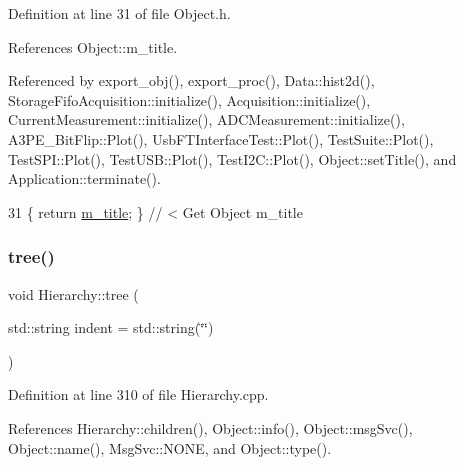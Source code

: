 Definition at line 31 of file Object.\+h.



References Object\+::m\+\_\+title.



Referenced by export\+\_\+obj(), export\+\_\+proc(), Data\+::hist2d(), Storage\+Fifo\+Acquisition\+::initialize(), Acquisition\+::initialize(), Current\+Measurement\+::initialize(), A\+D\+C\+Measurement\+::initialize(), A3\+P\+E\+\_\+\+Bit\+Flip\+::\+Plot(), Usb\+F\+T\+Interface\+Test\+::\+Plot(), Test\+Suite\+::\+Plot(), Test\+S\+P\+I\+::\+Plot(), Test\+U\+S\+B\+::\+Plot(), Test\+I2\+C\+::\+Plot(), Object\+::set\+Title(), and Application\+::terminate().


\begin{DoxyCode}
31 \{ \textcolor{keywordflow}{return} \hyperlink{classObject_affbeea1953eb5163573b92fad8f75727}{m\_title};      \} \textcolor{comment}{// < Get Object m\_title}
\end{DoxyCode}
\mbox{\label{classHierarchy_a76e914b9a677a22a82deb74d892bf261}} 
\subsubsection{\texorpdfstring{tree()}{tree()}\hspace{0.1cm}{\footnotesize\ttfamily [1/2]}}
{\footnotesize\ttfamily void Hierarchy\+::tree (\begin{DoxyParamCaption}\item[{std\+::string}]{indent = {\ttfamily std\+:\+:string(\char`\"{}\char`\"{})} }\end{DoxyParamCaption})\hspace{0.3cm}{\ttfamily [inherited]}}



Definition at line 310 of file Hierarchy.\+cpp.



References Hierarchy\+::children(), Object\+::info(), Object\+::msg\+Svc(), Object\+::name(), Msg\+Svc\+::\+N\+O\+NE, and Object\+::type().


